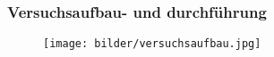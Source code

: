 \begin{frame}
  \frametitle{Versuchsaufbau- und durchführung}
\begin{figure}
  \centering
  \texttt{[image: bilder/versuchsaufbau.jpg]}
  \label{fig: versuchsaufbau}
\end{figure}
\end{frame}
